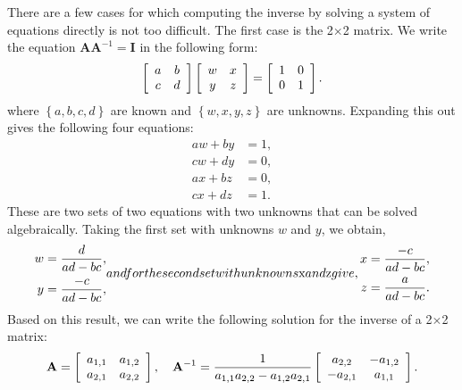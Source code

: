 There are a few cases for which computing the inverse by solving a system of equations directly is not too difficult. The first case is the 2$\times$2 matrix. We write the equation $\mathbf{A} \mathbf{A}^{-1} = \mathbf{I}$ in the following form:
\begin{align}
  \left[ \begin{array}{c c}  a &  b \\
  							 c &  d \\ \end{array} \right]
  \left[ \begin{array}{c c}  w &  x \\
  							 y &  z \\ \end{array} \right] =
  \left[ \begin{array}{c c}  1 &  0 \\
  							 0 &  1 \\ \end{array} \right]	.						 
\end{align}
where $\left\{ a, b, c, d \right\}$ are known and $\left\{ w, x, y, z \right\}$ are unknowns. Expanding this out gives the following four equations:
\begin{subequations}
\begin{align}
  aw + by &= 1, \\
  cw + dy &= 0, \\
  ax + bz &= 0, \\
  cx + dz &= 1.
\end{align}
\end{subequations}
These are two sets of two equations with two unknowns that can be solved algebraically. Taking the first set with unknowns $w$ and $y$, we obtain,
\begin{subequations}
\begin{align}
  w &= \frac{d}{ad - bc}, \\
  y &= \frac{-c}{ad - bc},
\end{align}
and for the second set with unknowns $x$ and $z$ give,
\begin{align}
  x &= \frac{-c}{ad - bc}, \\
  z &= \frac{a}{ad - bc}.
\end{align}
\end{subequations}
Based on this result, we can write the following solution for the inverse of a 2$\times$2 matrix:
\begin{align}
  \mathbf{A}      = \left[ \begin{array}{c c} a_{1,1} & a_{1,2} \\ a_{2,1} & a_{2,2} \\ \end{array} \right], \quad
  \mathbf{A}^{-1} = \frac{1}{a_{1,1} a_{2,2} - a_{1,2} a_{2,1} } \left[ \begin{array}{c c} a_{2,2} & -a_{1,2} \\ -a_{2,1} & a_{1,1} \\ \end{array} \right] .
\end{align}
